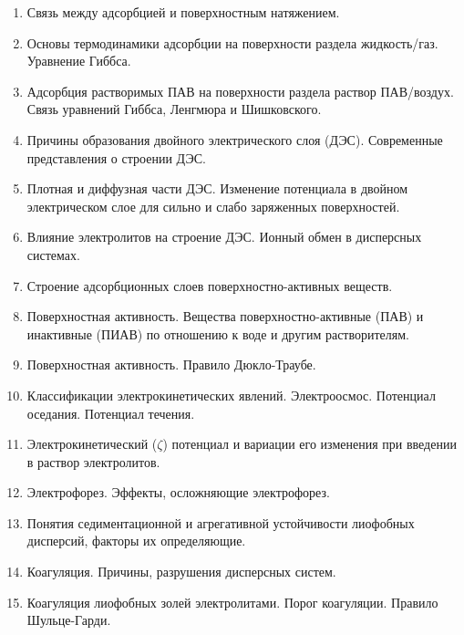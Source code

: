 \begin{enumerate}
\item 
Связь между адсорбцией и поверхностным натяжением.
 
\item 
Основы термодинамики адсорбции на поверхности раздела жидкость/газ. Уравнение Гиббса.
 
\item 
Адсорбция растворимых ПАВ на поверхности раздела раствор ПАВ/воздух. Связь уравнений Гиббса, Ленгмюра и Шишковского.
 
%
\item 
Причины образования двойного электрического слоя (ДЭС). Современные представления о строении ДЭС.
 
\item 
Плотная и диффузная части ДЭС. Изменение потенциала в двойном электрическом слое для сильно и слабо заряженных поверхностей.
 
\item 
Влияние электролитов на строение ДЭС. Ионный обмен в дисперсных системах.
 
%
\item 
Строение адсорбционных слоев поверхностно-активных веществ. 
 
\item 
Поверхностная активность. Вещества поверхностно-активные (ПАВ) и инактивные (ПИАВ) по отношению к воде и другим растворителям.
 
\item 
Поверхностная активность. Правило Дюкло-Траубе.
 
%
\item 
Классификации электрокинетических явлений. Электроосмос. Потенциал оседания. Потенциал течения.
 
\item 
Электрокинетический ($\zeta$) потенциал и вариации его изменения при введении в раствор электролитов. 
 
\item 
Электрофорез. Эффекты, осложняющие электрофорез. 
 
%
\item 
Понятия седиментационной и агрегативной устойчивости лиофобных дисперсий, факторы их определяющие.
 
\item 
Коагуляция. Причины, разрушения дисперсных систем. 
 
\item 
Коагуляция лиофобных золей электролитами. Порог коагуляции. Правило Шульце-Гарди.
 

\end{enumerate}
